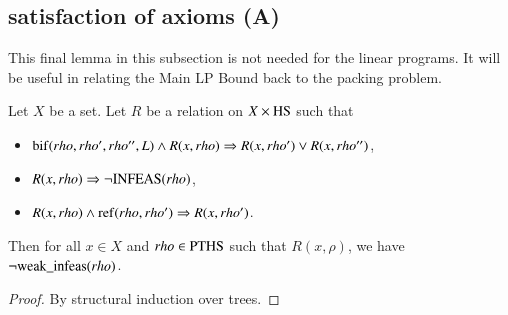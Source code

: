 

\subsection{satisfaction of axioms (A)}




This final lemma in this subsection is not needed for the linear
programs. It will be useful in relating the Main LP Bound back to
the packing problem.

\begin{lemma}  Let $X$ be a set.  Let $R$ be a relation on
$X\times {\operatorname{HS}}$ such that
    \begin{itemize}
    \item ${\operatorname{bif}}(rho,rho',rho'',L) \wedge R(x,rho)\Rightarrow
      R(x,rho') \vee R(x,rho'')$,
    \item $R(x,rho) \Rightarrow \neg {\operatorname{INFEAS}}(rho)$,
    \item $R(x,rho) \wedge {\operatorname{ref}}(rho,rho') \Rightarrow
    R(x,rho')$.
    \end{itemize}
Then for all $x\in X$ and $rho\in{\operatorname{PTHS}}$ such that
$R(x,\rho)$, we have $\neg {\operatorname{weak\_infeas}}(rho)$.
\end{lemma}

\begin{proof} By structural induction over trees.
\end{proof}
